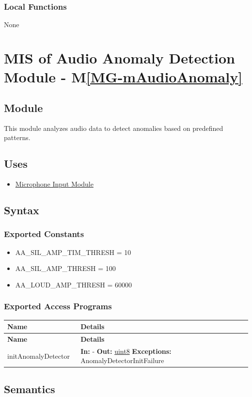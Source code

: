 \documentclass[12pt, titlepage]{article}
\newcommand{\mref}[1]{M\ref{#1}}
\newenvironment{apitable}{%
\begin{center}
\begin{longtable}{|p{0.3\linewidth}|p{0.7\linewidth}|} 
\hline
\textbf{Name} & \textbf{Details} \\
\hline
\endfirsthead
\hline
\textbf{Name} & \textbf{Details} \\
\hline
\endhead
\hline
\endfoot
\hline
\endlastfoot
}{%
\end{longtable}
\end{center}
}
\newcommand{\apifunc}[4]{%
#1 & 
\textbf{In:} #2 \newline
\textbf{Out:} #3 \newline
\textbf{Exceptions:} #4 \\
\hline
}
\begin{document}
\subsubsection{Local Functions}

None

\newpage

\section{MIS of Audio Anomaly Detection Module \label{mod:AudioAnomaly} -
  \mref{MG-mAudioAnomaly}}

\subsection{Module}
This module analyzes audio data to detect anomalies based on predefined
patterns.

\subsection{Uses}
\begin{itemize}
  \item \hyperref[mod:MicInput]{Microphone Input Module} 
\end{itemize}

\subsection{Syntax}
\subsubsection{Exported Constants}
\begin{itemize}
  \item AA\_SIL\_AMP\_TIM\_THRESH = 10
  \item AA\_SIL\_AMP\_THRESH = 100
  \item AA\_LOUD\_AMP\_THRESH = 60000
\end{itemize}

\subsubsection{Exported Access Programs}
\begin{apitable}
  \apifunc{initAnomalyDetector}
    {-}
    {\hyperref[generic:uint8]{uint8}}
    {AnomalyDetectorInitFailure}
\end{apitable}

\subsection{Semantics}
\end{document}
